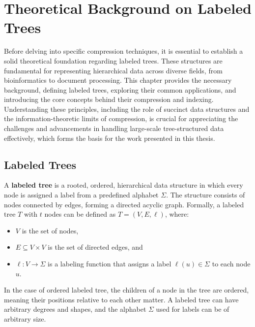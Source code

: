 \chapter{Theoretical Background on Labeled Trees} \label{chp:thbg_labeled_tree}
Before delving into specific compression techniques, it is essential to establish a solid theoretical foundation regarding labeled trees. These structures are fundamental for representing hierarchical data across diverse fields, from bioinformatics to document processing. This chapter provides the necessary background, defining labeled trees, exploring their common applications, and introducing the core concepts behind their compression and indexing. Understanding these principles, including the role of succinct data structures and the information-theoretic limits of compression, is crucial for appreciating the challenges and advancements in handling large-scale tree-structured data effectively, which forms the basis for the work presented in this thesis.

\section{Labeled Trees}
A \textbf{labeled tree} is a rooted, ordered, hierarchical data structure in which every node is assigned a label from a predefined alphabet $\Sigma$. The structure consists of nodes connected by edges, forming a directed acyclic graph. Formally, a labeled tree $T$ with $t$ nodes can be defined as $T = (V, E, \ell)$, where:
\begin{itemize}
    \item $V$ is the set of nodes,
    \item $E \subseteq V \times V$ is the set of directed edges, and
    \item $\ell: V \to \Sigma$ is a labeling function that assigns a label $\ell(u) \in \Sigma$ to each node $u$.
\end{itemize}

In the case of ordered labeled tree, the children of a node in the tree are ordered, meaning their positions relative to each other matter. A labeled tree can have arbitrary degrees and shapes, and the alphabet $\Sigma$ used for labels can be of arbitrary size.

